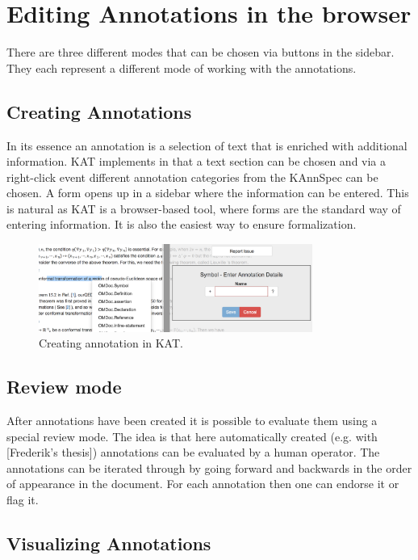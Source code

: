\section{Editing Annotations in the browser}

There are three different modes that can be chosen via buttons in the sidebar. They each represent a different mode of working with the annotations.


\subsection{Creating Annotations}
In its essence an annotation is a selection of text that is enriched with additional information. KAT implements in that a text section can be chosen and via a right-click event different annotation categories from the KAnnSpec can be chosen. A form opens up in a sidebar where the information can be entered. This is natural as KAT is a browser-based tool, where forms are the standard way of entering information. It is also the easiest way to ensure formalization.

\begin{figure}[htbp]
 \centering
 \includegraphics[width=0.8\textwidth]{imgs/annotation_creation.png}
 \caption{Creating annotation in KAT.}
\end{figure}

\subsection{Review mode}
After annotations have been created it is possible to evaluate them using a special review mode. The idea is that here automatically created (e.g. with [Frederik's thesis]) annotations can be evaluated by a human operator. The annotations can be iterated through by going forward and backwards in the order of appearance in the document. For each annotation then one can endorse it or flag it.

\subsection{Visualizing Annotations}

